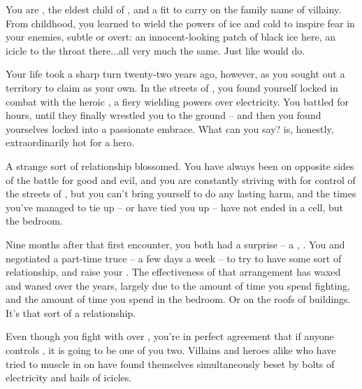 \documentclass[char]{LRSguildcamp1}
\begin{document}
\name{\cOldest{}}

You are , the eldest child of \cGrandma{\intro}, and a \cOldest{\offspring} fit to carry on the family name of villainy.  
From childhood, you learned to wield the powers of ice and cold to inspire fear in your enemies, subtle or overt: an innocent-looking patch of black ice here, an icicle to the throat there...all very much the same.  Just like \cGrandma{\Parent} would do.


Your life took a sharp turn twenty-two years ago, however, as you sought out a territory to claim as your own.  In the streets of \pCityO{}, you found yourself locked in combat with the heroic \cOS{\intro}, a fiery \cOS{\hero} wielding powers over electricity.  You battled for hours, until they finally wrestled you to the ground -- and then you found yourselves locked into a passionate embrace.  What can you say?  \cOS{} is, honestly, extraordinarily hot for a hero.

A strange sort of relationship blossomed.  You have always been on opposite sides of the battle for good and evil, and you are constantly striving with \cOS{\them} for control of the streets of \pCityO{}, but you can't bring yourself to do \cOS{\them} any lasting harm, and the times you've managed to tie \cOS{\them} up -- or \cOS{\they} have tied you up -- have not ended in a cell, but the bedroom.

Nine months after that first encounter, you both had a surprise -- a \cGrad{\offspring}, \cGrad{\intro}.  You and \cOS{} negotiated a part-time truce -- a few days a week -- to try to have some sort of relationship, and raise your \cGrad{\offspring}.  The effectiveness of that arrangement has waxed and waned over the years, largely due to the amount of time you spend fighting, and the amount of time you spend in the bedroom.  Or on the roofs of buildings.  It's that sort of a relationship.


Even though you fight with \cOS{} over \pCityO{}, you're in perfect agreement that if anyone controls \pCityO{}, it is going to be one of you two.  Villains and heroes alike who have tried to muscle in on \pCityO{} have found themselves simultaneously beset by bolts of electricity and hails of icicles.
\end{document}
